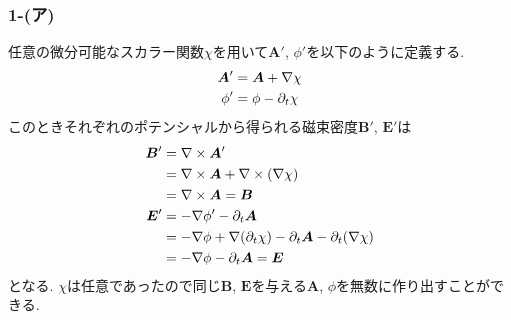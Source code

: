 \subsubsection*{1-(ア)}
任意の微分可能なスカラー関数$\chi$を用いて${\bm A'}$, $\phi'$を以下のように定義する.
\begin{align*}
  {\bm A'} & ={\bm A}+\nabla\chi   \\
  \phi'    & =\phi-\partial_t\chi
\end{align*}
このときそれぞれのポテンシャルから得られる磁束密度${\bm B'}$, ${\bm E'}$は
\begin{align*}
  {\bm B'} & =\nabla\times{\bm A'}                                                             \\
           & =\nabla\times{\bm A}+\nabla\times(\nabla\chi)                                              \\
           & =\nabla\times{\bm A}={\bm B}                                                      \\
  {\bm E'} & =-\nabla\phi'-\partial_t{\bm A}                                            \\
           & =-\nabla\phi+\nabla(\partial_t\chi)-\partial_t{\bm A}-\partial_t(\nabla\chi) \\
           & =-\nabla\phi-\partial_t{\bm A}={\bm E}
\end{align*}
となる. $\chi$は任意であったので同じ${\bm B}$, ${\bm E}$を与える${\bm A}$, $\phi$を無数に作り出すことができる.
